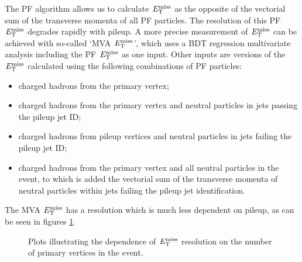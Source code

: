 The \ac{PF} algorithm allows us to calculate $E_{\mathrm{T}}^{\text{miss}}$ as the opposite of the vectorial sum
of the transverse momenta of all \ac{PF} particles. The resolution of this PF
$E_{\mathrm{T}}^{\text{miss}}$ degrades rapidly with pileup. A more precise
measurement of $E_{\mathrm{T}}^{\text{miss}}$ can be achieved with so-called `MVA
$E_{\mathrm{T}}^{\text{miss}}$', which uses a \ac{BDT} regression multivariate analysis
including the \ac{PF} $E_{\mathrm{T}}^{\text{miss}}$ as one input. Other inputs are versions of the
$E_{\mathrm{T}}^{\text{miss}}$ calculated using the following combinations of \ac{PF} particles: 
\begin{itemize}
\item charged hadrons from the primary vertex;
\item charged hadrons from the primary vertex and neutral particles in jets
passing the pileup jet ID;
\item charged hadrons from pileup vertices and neutral particles in jets failing
the pileup jet ID;
\item charged hadrons from the primary vertex and all neutral particles in the
event, to which is added the vectorial sum of the transverse momenta of neutral
particles within jets failing the pileup jet identification.
\end{itemize}

The MVA $E_{\mathrm{T}}^{\text{miss}}$ has a resolution which is much less
dependent on pileup, as can be seen in figures \ref{fig:mvamet}.

\begin{figure}
\begin{center}
\end{center}
\caption{Plots illustrating the dependence of $E_{\mathrm{T}}^{\text{miss}}$ resolution on the number of
primary vertices in the event.
}
\label{fig:mvamet}
\end{figure}


